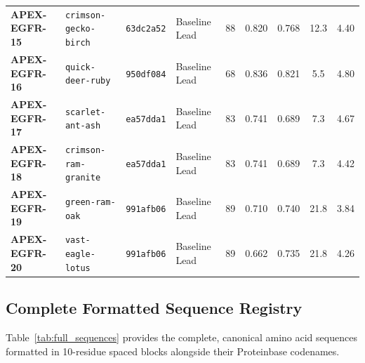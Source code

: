 \documentclass[11pt]{article}
\begin{document}
\begin{table}[htbp]
\begin{tabularx}{\textwidth}{llp{1.3cm}Xccccc}
\textbf{APEX-EGFR-15} & \texttt{crimson-gecko-birch} & \texttt{63dc2a52} & Baseline Lead & 88 & 0.820 & 0.768 & 12.3 & 4.40 \\
\textbf{APEX-EGFR-16} & \texttt{quick-deer-ruby} & \texttt{950df084} & Baseline Lead & 68 & 0.836 & 0.821 & 5.5 & 4.80 \\
\textbf{APEX-EGFR-17} & \texttt{scarlet-ant-ash} & \texttt{ea57dda1} & Baseline Lead & 83 & 0.741 & 0.689 & 7.3 & 4.67 \\
\textbf{APEX-EGFR-18} & \texttt{crimson-ram-granite} & \texttt{ea57dda1} & Baseline Lead & 83 & 0.741 & 0.689 & 7.3 & 4.42 \\
\textbf{APEX-EGFR-19} & \texttt{green-ram-oak} & \texttt{991afb06} & Baseline Lead & 89 & 0.710 & 0.740 & 21.8 & 3.84 \\
\textbf{APEX-EGFR-20} & \texttt{vast-eagle-lotus} & \texttt{991afb06} & Baseline Lead & 89 & 0.662 & 0.735 & 21.8 & 4.26 \\
\bottomrule
\end{tabularx}
\end{table}

\subsection{Complete Formatted Sequence Registry}
Table~\ref{tab:full_sequences} provides the complete, canonical amino acid sequences formatted in 10-residue spaced blocks alongside their Proteinbase codenames.
\end{document}
